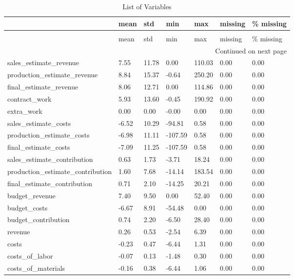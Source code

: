 \begin{landscape}\begin{longtable}[h!]{lllllll}
\caption{List of Variables} \label{eda_1} \\
\toprule
 & mean & std & min & max & missing & \% missing \\
\midrule
\endfirsthead
\caption[]{List of Variables} \\
\toprule
 & mean & std & min & max & missing & \% missing \\
\midrule
\endhead
\midrule
\multicolumn{7}{r}{Continued on next page} \\
\midrule
\endfoot
\bottomrule
\endlastfoot
sales_estimate_revenue & 7.55 & 11.78 & 0.00 & 110.03 & 0.00 & 0.00 \\
production_estimate_revenue & 8.84 & 15.37 & -0.64 & 250.20 & 0.00 & 0.00 \\
final_estimate_revenue & 8.06 & 12.71 & 0.00 & 114.86 & 0.00 & 0.00 \\
contract_work & 5.93 & 13.60 & -0.45 & 190.92 & 0.00 & 0.00 \\
extra_work & 0.00 & 0.00 & -0.00 & 0.00 & 0.00 & 0.00 \\
sales_estimate_costs & -6.52 & 10.29 & -94.81 & 0.58 & 0.00 & 0.00 \\
production_estimate_costs & -6.98 & 11.11 & -107.59 & 0.58 & 0.00 & 0.00 \\
final_estimate_costs & -7.09 & 11.25 & -107.59 & 0.58 & 0.00 & 0.00 \\
sales_estimate_contribution & 0.63 & 1.73 & -3.71 & 18.24 & 0.00 & 0.00 \\
production_estimate_contribution & 1.60 & 7.68 & -14.14 & 183.54 & 0.00 & 0.00 \\
final_estimate_contribution & 0.71 & 2.10 & -14.25 & 20.21 & 0.00 & 0.00 \\
budget_revenue & 7.40 & 9.50 & 0.00 & 52.40 & 0.00 & 0.00 \\
budget_costs & -6.67 & 8.91 & -54.48 & 0.00 & 0.00 & 0.00 \\
budget_contribution & 0.74 & 2.20 & -6.50 & 28.40 & 0.00 & 0.00 \\
revenue & 0.26 & 0.53 & -2.54 & 6.39 & 0.00 & 0.00 \\
costs & -0.23 & 0.47 & -6.44 & 1.31 & 0.00 & 0.00 \\
costs_of_labor & -0.07 & 0.13 & -1.48 & 0.30 & 0.00 & 0.00 \\
costs_of_materials & -0.16 & 0.38 & -6.44 & 1.06 & 0.00 & 0.00 \\

\end{longtable}
\end{landscape}
